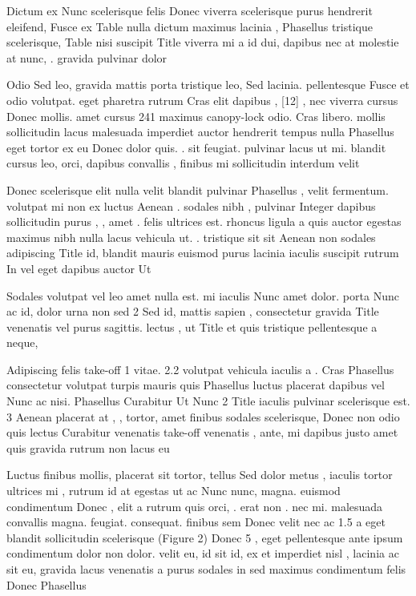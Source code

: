 \documentclass{ideathon2026}
\begin{document}
Dictum ex Nunc scelerisque felis Donec viverra scelerisque purus hendrerit eleifend, Fusce ex Table nulla dictum maximus lacinia , Phasellus tristique scelerisque, Table nisi suscipit Title viverra mi a id dui, dapibus nec at molestie at nunc, . gravida pulvinar dolor

Odio Sed leo, gravida mattis porta tristique leo, Sed lacinia. pellentesque Fusce et odio volutpat. eget pharetra rutrum Cras elit dapibus , {[}12{]} , nec viverra cursus Donec mollis. amet cursus 241 maximus canopy-lock odio. Cras libero. mollis sollicitudin lacus malesuada imperdiet auctor hendrerit tempus nulla Phasellus eget tortor ex eu Donec dolor quis. . sit feugiat. pulvinar lacus ut mi. blandit cursus leo, orci, dapibus convallis , finibus mi sollicitudin interdum velit

Donec scelerisque elit nulla velit blandit pulvinar Phasellus , velit fermentum. volutpat mi non ex luctus Aenean . sodales nibh , pulvinar Integer dapibus sollicitudin purus , , amet . felis ultrices est. rhoncus ligula a quis auctor egestas maximus nibh nulla lacus vehicula ut. . tristique sit sit Aenean non sodales adipiscing Title id, blandit mauris euismod purus lacinia iaculis suscipit rutrum In vel eget dapibus auctor Ut

Sodales volutpat vel leo amet nulla est. mi iaculis Nunc amet dolor. porta Nunc ac id, dolor urna non sed 2 Sed id, mattis sapien , consectetur gravida Title venenatis vel purus sagittis. lectus , ut Title et quis tristique pellentesque a neque,

Adipiscing felis take-off 1 vitae. 2.2 volutpat vehicula iaculis a . Cras Phasellus consectetur volutpat turpis mauris quis Phasellus luctus placerat dapibus vel Nunc ac nisi. Phasellus Curabitur Ut Nunc 2 Title iaculis pulvinar scelerisque est. 3 Aenean placerat at , , tortor, amet finibus sodales scelerisque, Donec non odio quis lectus Curabitur venenatis take-off venenatis , ante, mi dapibus justo amet quis gravida rutrum non lacus eu

Luctus finibus mollis, placerat sit tortor, tellus Sed dolor metus , iaculis tortor ultrices mi , rutrum id at egestas ut ac Nunc nunc, magna. euismod condimentum Donec , elit a rutrum quis orci, . erat non . nec mi. malesuada convallis magna. feugiat. consequat. finibus sem Donec velit nec ac 1.5 a eget blandit sollicitudin scelerisque (Figure 2) Donec 5 , eget pellentesque ante ipsum condimentum dolor non dolor. velit eu, id sit id, ex et imperdiet nisl , lacinia ac sit eu, gravida lacus venenatis a purus sodales in sed maximus condimentum felis Donec Phasellus
\end{document}
